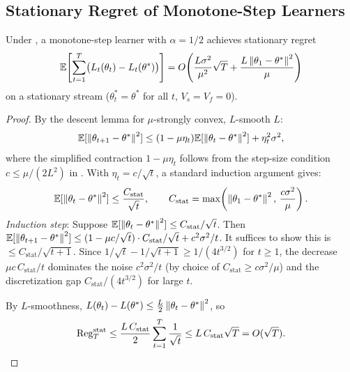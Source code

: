 \subsection{Stationary Regret of Monotone-Step Learners}

\begin{lemma}
\label{lem:stationary-regret}
Under , a
monotone-step learner with $\alpha = 1/2$ achieves stationary regret
\[
  \mathbb{E}\Biggl[\sum_{t=1}^T \bigl(L_t(\theta_t) - L_t(\theta^*)\bigr)\Biggr]
  = O\!\left(\frac{L\sigma^2}{\mu^2}\sqrt{T} + \frac{L\left\|\theta_1 - \theta^*\right\|^2}{\mu}\right)
\]
on a stationary stream ($\theta^*_t = \theta^*$ for all $t$, $V_s = V_f = 0$).
\end{lemma}

\begin{proof}
By the descent lemma for $\mu$-strongly convex, $L$-smooth $L$:
\[
  \mathbb{E}[\left\|\theta_{t+1} - \theta^*\right\|^2]
  \leq (1 - \mu\eta_t)\mathbb{E}[\left\|\theta_t - \theta^*\right\|^2]
    + \eta_t^2 \sigma^2,
\]
where the simplified contraction $1-\mu\eta_t$ follows from
the step-size condition $c \leq \mu/(2L^2)$ in .
With $\eta_t = c/\sqrt{t}$, a standard induction argument gives:
\[
  \mathbb{E}[\left\|\theta_t - \theta^*\right\|^2]
  \leq \frac{C_{\mathrm{stat}}}{\sqrt{t}}, \qquad
  C_{\mathrm{stat}} = \max\!\left(\left\|\theta_1-\theta^*\right\|^2,\,
  \frac{c\sigma^2}{\mu}\right).
\]
\emph{Induction step}: Suppose $\mathbb{E}[\left\|\theta_t-\theta^*\right\|^2] \leq
C_{\mathrm{stat}}/\sqrt{t}$. Then
$\mathbb{E}[\left\|\theta_{t+1}-\theta^*\right\|^2] \leq
(1-\mu c/\sqrt{t})\cdot C_{\mathrm{stat}}/\sqrt{t} + c^2\sigma^2/t$.
It suffices to show this is $\leq C_{\mathrm{stat}}/\sqrt{t+1}$.
Since $1/\sqrt{t} - 1/\sqrt{t+1} \geq 1/(4t^{3/2})$ for $t \geq 1$,
the decrease $\mu c\, C_{\mathrm{stat}}/t$ dominates the noise
$c^2\sigma^2/t$ (by choice of $C_{\mathrm{stat}} \geq c\sigma^2/\mu$)
and the discretization gap $C_{\mathrm{stat}}/(4t^{3/2})$ for large $t$.

By $L$-smoothness, $L(\theta_t) - L(\theta^*) \leq
\frac{L}{2}\left\|\theta_t-\theta^*\right\|^2$, so
\[
  \mathrm{Reg}_T^{\mathrm{stat}} \leq \frac{L\, C_{\mathrm{stat}}}{2}
  \sum_{t=1}^T \frac{1}{\sqrt{t}}
  \leq L\, C_{\mathrm{stat}} \sqrt{T}
  = O(\sqrt{T}).
  \qedhere
\]
\end{proof}

